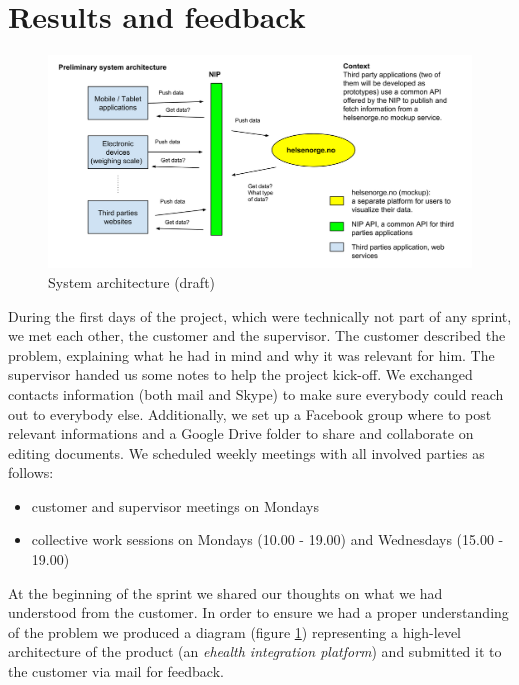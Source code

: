 \section{Results and feedback}

\begin{figure}[h]
\centering
\includegraphics[scale=0.30]{../Figures/architecture-draft.png}
\caption{System architecture (draft)}
\label{figure:architecture-draft}
\end{figure}

During the first days of the project, which were technically not part of any sprint,
we met each other, the customer and the supervisor.
The customer described the problem, explaining what he had in mind and why it was relevant for him.
The supervisor handed us some notes to help the project kick-off.
We exchanged contacts information (both mail and Skype) to make sure everybody could reach out to
everybody else. Additionally, we set up a Facebook group where to post relevant informations
and a Google Drive folder to share and collaborate on editing documents.
We scheduled weekly meetings with all involved parties as follows:
\begin{itemize}
\item customer and supervisor meetings on Mondays
\item collective work sessions on Mondays (10.00 - 19.00) and Wednesdays (15.00 - 19.00)
\end{itemize}

At the beginning of the sprint we shared our thoughts on what we had understood from the customer.
In order to ensure we had a proper understanding of the problem we produced a diagram
(figure \ref{figure:architecture-draft}) representing a high-level architecture
of the product (an \textit{ehealth integration platform}) and submitted it to the customer
via mail for feedback.

